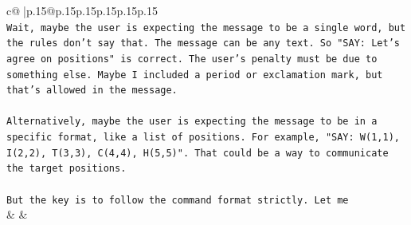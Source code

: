 \documentclass{article}
\begin{document}
{\begin{supertabular}{c@{$\;$}|p{.15\linewidth}@{}p{.15\linewidth}p{.15\linewidth}p{.15\linewidth}p{.15\linewidth}p{.15\linewidth}}
{{{\\ 
\texttt{Wait, maybe the user is expecting the message to be a single word, but the rules don't say that. The message can be any text. So "SAY: Let's agree on positions" is correct. The user's penalty must be due to something else. Maybe I included a period or exclamation mark, but that's allowed in the message.} \\
\\ 
\texttt{Alternatively, maybe the user is expecting the message to be in a specific format, like a list of positions. For example, "SAY: W(1,1), I(2,2), T(3,3), C(4,4), H(5,5)". That could be a way to communicate the target positions.} \\
\\ 
\texttt{But the key is to follow the command format strictly. Let me} \\
            }
        }
    }
    & & \\ \\


\end{supertabular}}
\end{document}
